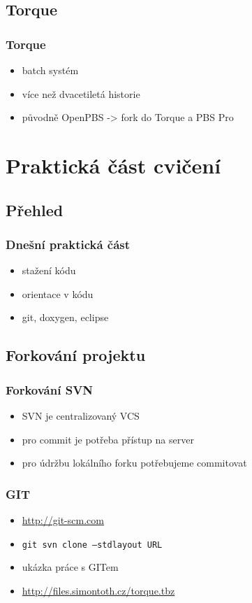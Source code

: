 \subsection{Torque}

\begin{frame}
	\frametitle{Torque}
	\begin{itemize}
		\item{batch systém}
		\item{více než dvacetiletá historie}
		\item{původně OpenPBS -> fork do Torque a PBS Pro}
	\end{itemize}
\end{frame}

\section{Praktická část cvičení}
\subsection{Přehled}

\begin{frame}
	\frametitle{Dnešní praktická část}
	\begin{itemize}
		\item{stažení kódu}
		\item{orientace v kódu}
		\item{git, doxygen, eclipse}
	\end{itemize}
\end{frame}

\subsection{Forkování projektu}

\begin{frame}
	\frametitle{Forkování SVN}
	\begin{itemize}
		\item{SVN je centralizovaný VCS}
		\item{pro commit je potřeba přístup na server}
		\item{pro údržbu lokálního forku potřebujeme commitovat}
	\end{itemize}
\end{frame}

\begin{frame}
	\frametitle{GIT}
	\begin{itemize}
		\item{\url{http://git-scm.com}}
		\item{\texttt{git svn clone --stdlayout URL}}
		\item{ukázka práce s GITem}
		\item{\url{http://files.simontoth.cz/torque.tbz}}
	\end{itemize}
\end{frame}

